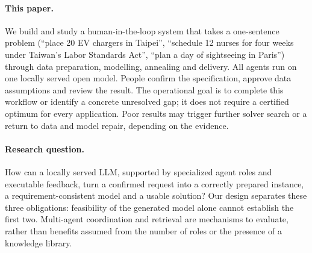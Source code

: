 \paragraph{This paper.}
We build and study a human-in-the-loop system that takes a one-sentence problem (``place 20 EV chargers in
Taipei'', ``schedule 12 nurses for four weeks under Taiwan's Labor Standards Act'', ``plan a day of sightseeing in
Paris'') through data preparation, modelling, annealing and delivery. All agents run on one locally served open
model. People confirm the specification, approve data assumptions and review the result. The operational goal is
to complete this workflow or identify a concrete unresolved gap; it does not require a certified optimum for
every application. Poor results may trigger further solver search or a return to data and model repair,
depending on the evidence.

\paragraph{Research question.}
How can a locally served LLM, supported by specialized agent roles and executable feedback, turn a confirmed
request into a correctly prepared instance, a requirement-consistent model and a usable solution? Our design
separates these three obligations: feasibility of the generated model alone cannot establish the first two.
Multi-agent coordination and retrieval are mechanisms to evaluate, rather than benefits assumed from the
number of roles or the presence of a knowledge library.

